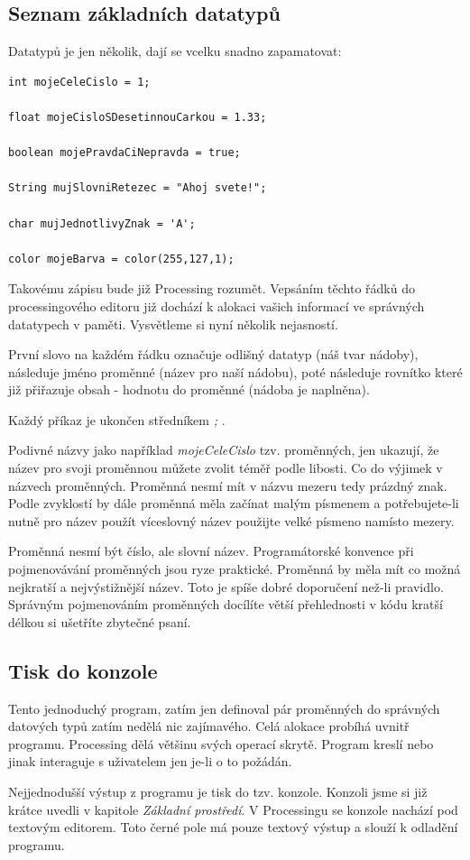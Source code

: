 \documentclass[12pt,twopage]{book}
\newcommand{\pododdil}[1]{\subsection{#1}\label{subsec:#1}}
\begin{document}
\pododdil{Seznam základních datatypů}
Datatypů je jen několik, dají se vcelku snadno zapamatovat:

\begin{lstlisting}
int mojeCeleCislo = 1;

float mojeCisloSDesetinnouCarkou = 1.33;

boolean mojePravdaCiNepravda = true;

String mujSlovniRetezec = "Ahoj svete!";

char mujJednotlivyZnak = 'A';

color mojeBarva = color(255,127,1);
\end{lstlisting}

Takovému zápisu bude již Processing rozumět. Vepsáním těchto řádků do processingového editoru již dochází k alokaci vašich informací ve správných datatypech v paměti. Vysvětleme si nyní několik nejasností.

První slovo na každém řádku označuje odlišný datatyp (náš tvar nádoby), následuje jméno proměnné (název pro naší nádobu), poté následuje rovnítko které již přiřazuje obsah - hodnotu do proměnné (nádoba je naplněna).

Každý příkaz je ukončen středníkem {\em ;} .

Podivné názvy jako například {\em mojeCeleCislo} tzv. proměnných, jen ukazují, že název pro svoji proměnnou můžete zvolit téměř podle libosti. Co do výjimek v názvech proměnných. Proměnná nesmí mít v názvu mezeru tedy prázdný znak. Podle zvyklostí by dále proměnná měla začínat malým písmenem a potřebujete-li nutně pro název použít víceslovný název použijte velké písmeno namísto mezery.

Proměnná nesmí být číslo, ale slovní název. Programátorské konvence při pojmenovávání proměnných jsou ryze praktické. Proměnná by měla mít co možná nejkratší a nejvýstižnější název.  Toto je spíše dobré doporučení než-li pravidlo. Správným pojmenováním proměnných docílíte větší přehlednosti v kódu kratší délkou si ušetříte zbytečné psaní.

\pododdil{Tisk do konzole}

Tento jednoduchý program, zatím jen definoval pár proměnných do správných datových typů zatím nedělá nic zajímavého. Celá alokace probíhá uvnitř programu. Processing dělá většinu svých operací skrytě. Program kreslí nebo jinak interaguje s uživatelem jen je-li o to požádán.

Nejjednodušší výstup z programu je tisk do tzv. konzole. Konzoli jsme si již krátce uvedli v kapitole {\em Základní prostředí}. V Processingu se konzole nachází pod textovým editorem. Toto černé pole má pouze textový výstup a slouží k odladění programu.
\end{document}
